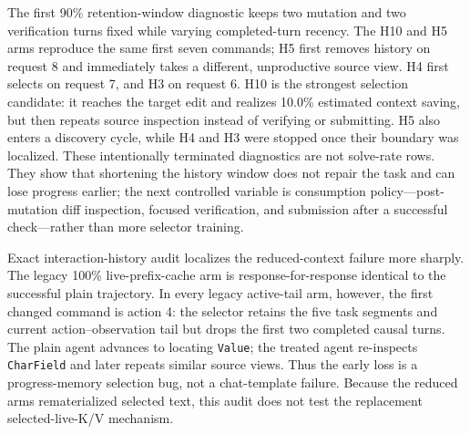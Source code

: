 \documentclass[11pt]{article}
\begin{document}
The first 90\% retention-window diagnostic keeps two mutation and two
verification turns fixed while varying completed-turn recency. The H10 and H5
arms reproduce the same first seven commands; H5 first removes history on
request 8 and immediately takes a different, unproductive source view. H4
first selects on request 7, and H3 on request 6. H10 is the strongest selection
candidate: it reaches the target edit and realizes 10.0\% estimated context
saving, but then repeats source inspection instead of verifying or submitting.
H5 also enters a discovery cycle, while H4 and H3 were stopped once their
boundary was localized. These intentionally terminated diagnostics are not
solve-rate rows. They show that shortening the history window does not repair
the task and can lose progress earlier; the next controlled variable is
consumption policy---post-mutation diff inspection, focused verification, and
submission after a successful check---rather than more selector training.

Exact interaction-history audit localizes the reduced-context failure more
sharply.  The legacy 100\% live-prefix-cache arm is response-for-response identical to the
successful plain trajectory.  In every legacy active-tail arm, however, the
first changed command is action 4: the selector retains the five task segments
and current action--observation tail but drops the first two completed causal
turns.  The plain agent advances to locating \texttt{Value}; the treated agent
re-inspects \texttt{CharField} and later repeats similar source views.  Thus the
early loss is a progress-memory selection bug, not a chat-template failure.
Because the reduced arms rematerialized selected text, this audit does not test
the replacement selected-live-K/V mechanism.
\end{document}
